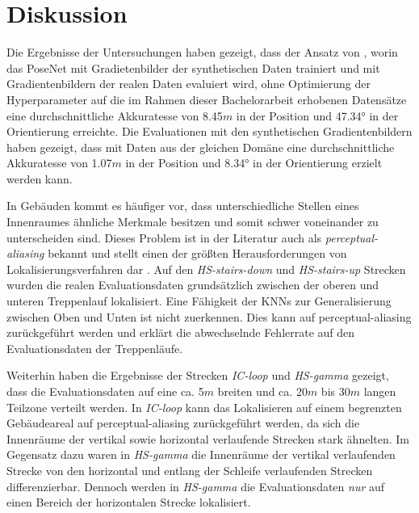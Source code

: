 
\section{Diskussion}
\label{sec:kapitel_5}


Die Ergebnisse der Untersuchungen haben gezeigt, dass der Ansatz von \citet{acharyaBIMPoseNetIndoorCamera2019}, worin das PoseNet mit Gradietenbilder der synthetischen Daten trainiert und mit Gradientenbildern der realen Daten evaluiert wird, ohne Optimierung der Hyperparameter auf die im Rahmen dieser Bachelorarbeit erhobenen Datensätze eine durchschnittliche Akkuratesse von 8.45$m$ in der Position und 47.34° in der Orientierung erreichte. Die Evaluationen mit den synthetischen Gradientenbildern haben gezeigt, dass mit Daten aus der gleichen Domäne eine durchschnittliche Akkuratesse von 1.07$m$ in der Position und 8.34° in der Orientierung erzielt werden kann. 

In Gebäuden kommt es häufiger vor, dass unterschiedliche Stellen eines Innenraumes ähnliche Merkmale besitzen und somit schwer voneinander zu unterscheiden sind. Dieses Problem ist in der Literatur auch als \textit{perceptual-aliasing} bekannt und stellt einen der größten Herausforderungen von Lokalisierungsverfahren dar \cite{lowryVisualPlaceRecognition2016}. Auf den \textit{HS-stairs-down} und \textit{HS-stairs-up} Strecken wurden die realen Evaluationsdaten grundsätzlich zwischen der oberen und unteren Treppenlauf lokalisiert. Eine Fähigkeit der KNNs zur Generalisierung zwischen Oben und Unten ist nicht zuerkennen. Dies kann auf perceptual-aliasing zurückgeführt werden und erklärt die abwechselnde Fehlerrate auf den Evaluationsdaten der Treppenläufe.

Weiterhin haben die Ergebnisse der Strecken \textit{IC-loop} und \textit{HS-gamma} gezeigt, dass die Evaluationsdaten auf eine ca. 5$m$ breiten und ca. 20$m$ bis 30$m$ langen Teilzone verteilt werden. In \textit{IC-loop} kann das Lokalisieren auf einem begrenzten Gebäudeareal auf perceptual-aliasing zurückgeführt werden, da sich die Innenräume der vertikal sowie horizontal verlaufende Strecken stark ähnelten. Im Gegensatz dazu waren in \textit{HS-gamma} die Innenräume der vertikal verlaufenden Strecke von den horizontal und entlang der Schleife verlaufenden Strecken differenzierbar. Dennoch werden in \textit{HS-gamma} die Evaluationsdaten \textit{nur} auf einen Bereich der horizontalen Strecke lokalisiert.

